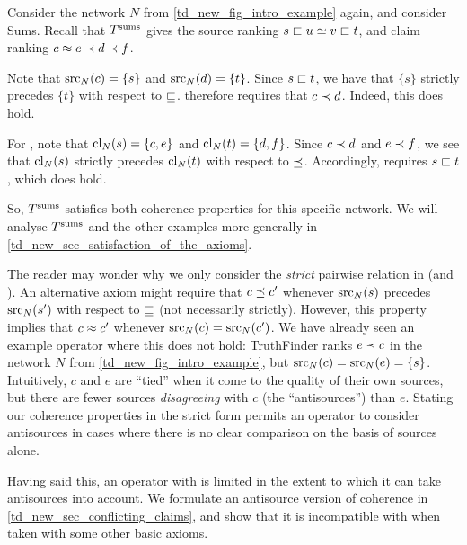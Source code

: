 \begin{example}
    \label{td_new_ex_coherence_ilustration}
    Consider the network $N$ from \cref{td_new_fig_intro_example} again, and
    consider Sums. Recall that $T^{\operatorname{sums}}$ gives the source ranking $s \sqsubset u \simeq
    v \sqsubset t$, and claim ranking $c \approx e \prec d \prec f$.

    Note that $\operatorname{src}_N(c) = \{s\}$ and $\operatorname{src}_N(d) = \{t\}$. Since $s \sqsubset t$, we
    have that $\{s\}$ strictly precedes $\{t\}$ with respect to $\sqsubseteq$.
    \claimcoherence{} therefore requires that $c \prec d$. Indeed, this does
    hold.

    For \sourcecoherence{}, note that $\operatorname{cl}_N(s) = \{c, e\}$ and
    $\operatorname{cl}_N(t) = \{d, f\}$. Since $c \prec d$ and $e \prec f$, we see that
    $\operatorname{cl}_N(s)$ strictly precedes $\operatorname{cl}_N(t)$ with respect to $\preceq$.
    Accordingly, \sourcecoherence{} requires $s \sqsubset t$, which does hold.

    So, $T^{\operatorname{sums}}$ satisfies both coherence properties for this specific network.
    We will analyse $T^{\operatorname{sums}}$ and the other examples more generally in
    \cref{td_new_sec_satisfaction_of_the_axioms}.
\end{example}

The reader may wonder why we only consider the \emph{strict} pairwise relation
in \claimcoherence{} (and \sourcecoherence{}). An alternative axiom might
require that $c \preceq c'$ whenever $\operatorname{src}_N(s)$ precedes $\operatorname{src}_N(s')$ with
respect to $\sqsubseteq$ (not necessarily strictly). However, this property implies
that $c \approx c'$ whenever $\operatorname{src}_N(c) = \operatorname{src}_N(c')$. We have already seen an
example operator where this does not hold: TruthFinder ranks $e \prec c$ in the
network $N$ from \cref{td_new_fig_intro_example}, but $\operatorname{src}_N(c) = \operatorname{src}_N(e) =
\{s\}$. Intuitively, $c$ and $e$ are ``tied'' when it come to the quality of
their own sources, but there are fewer sources \emph{disagreeing} with $c$ (the
``antisources'') than $e$. Stating our coherence properties in the strict form
permits an operator to consider antisources in cases where there is no clear
comparison on the basis of sources alone.

Having said this, an operator with \claimcoherence{} is limited in the extent
to which it can take antisources into account. We formulate an antisource
version of coherence in \cref{td_new_sec_conflicting_claims}, and show that
it is incompatible with \claimcoherence{} when taken with some other basic
axioms.


